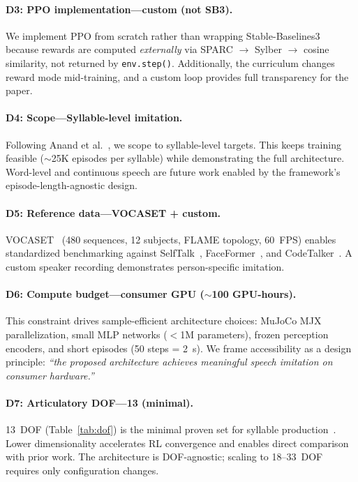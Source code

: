 \documentclass[11pt, a4paper]{article}
\newcommand{\flame}{\textsc{FLAME}}
\begin{document}
\paragraph{D3: PPO implementation---custom (not SB3).}
We implement PPO from scratch rather than wrapping Stable-Baselines3~\cite{raffel2023sb3} because rewards are computed \emph{externally} via SPARC $\to$ Sylber $\to$ cosine similarity, not returned by \texttt{env.step()}. Additionally, the curriculum changes reward mode mid-training, and a custom loop provides full transparency for the paper.

\paragraph{D4: Scope---Syllable-level imitation.}
Following Anand et al.~\cite{anand2025articulatory}, we scope to syllable-level targets. This keeps training feasible ($\sim$25K episodes per syllable) while demonstrating the full architecture. Word-level and continuous speech are future work enabled by the framework's episode-length-agnostic design.

\paragraph{D5: Reference data---VOCASET + custom.}
VOCASET~\cite{li2021vocaset} (480 sequences, 12 subjects, \flame{} topology, 60~FPS) enables standardized benchmarking against SelfTalk~\cite{richard2021selftalk}, FaceFormer~\cite{fan2022faceformer}, and CodeTalker~\cite{xing2023codetalker}. A custom speaker recording demonstrates person-specific imitation.

\paragraph{D6: Compute budget---consumer GPU ($\sim$100 GPU-hours).}
This constraint drives sample-efficient architecture choices: MuJoCo MJX parallelization, small MLP networks ($<$1M parameters), frozen perception encoders, and short episodes (50 steps = 2~s). We frame accessibility as a design principle: \emph{``the proposed architecture achieves meaningful speech imitation on consumer hardware.''}

\paragraph{D7: Articulatory DOF---13 (minimal).}
13~DOF (Table~\ref{tab:dof}) is the minimal proven set for syllable production~\cite{anand2025articulatory}. Lower dimensionality accelerates RL convergence and enables direct comparison with prior work. The architecture is DOF-agnostic; scaling to 18--33~DOF requires only configuration changes.
\end{document}
